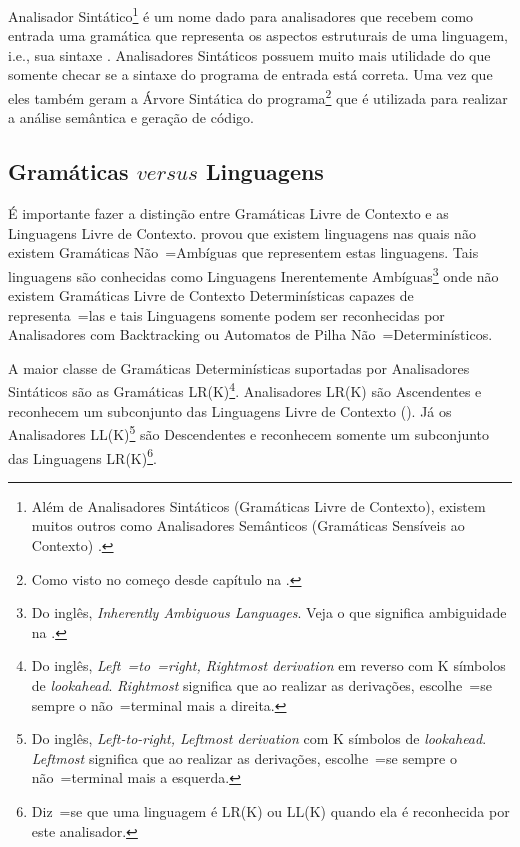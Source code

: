 Analisador Sintático\footnote{
Além de Analisadores Sintáticos (Gramáticas Livre de Contexto),
existem muitos outros como Analisadores Semânticos (Gramáticas Sensíveis ao Contexto) \cite{contextSensitiveParsing}.
}
é um nome dado para analisadores que recebem como entrada uma gramática que representa os aspectos estruturais de uma linguagem,
i.e.,
sua sintaxe \cite{ahoCompilerDragonBook}.
Analisadores Sintáticos possuem muito mais utilidade do que somente checar se a sintaxe do programa de entrada está correta.
Uma vez que eles também geram a Árvore Sintática do programa\footnote{
Como visto no começo desde capítulo na .
}
que é utilizada para realizar a análise semântica e
geração de código.


\subsection{Gramáticas $versus$ Linguagens}
\label{gramaticasVersusLinguagens}

É importante fazer a distinção entre Gramáticas Livre de Contexto e
as Linguagens Livre de Contexto.
 provou que existem linguagens nas quais não existem Gramáticas Não~=Ambíguas que representem estas linguagens.
Tais linguagens são conhecidas como Linguagens Inerentemente Ambíguas\footnote{
Do inglês,
\textit{Inherently Ambiguous Languages}.
Veja o que significa ambiguidade na .
}
onde não existem Gramáticas Livre de Contexto Determinísticas capazes de representa~=las e
tais Linguagens somente podem ser reconhecidas por Analisadores com Backtracking \cite{ahoCompilerDragonBook} ou
Automatos de Pilha Não~=Determinísticos.

A maior classe de Gramáticas Determinísticas suportadas por Analisadores Sintáticos são as Gramáticas LR(K)\footnote{
Do inglês, \textit{Left~=to~=right,
Rightmost derivation} em reverso com K símbolos de \textit{lookahead}.
\textit{Rightmost} significa que ao realizar as derivações,
escolhe~=se sempre o não~=terminal mais a direita.
}.
Analisadores LR(K) \cite{ahoCompilerDragonBook} são Ascendentes e
reconhecem um subconjunto das Linguagens Livre de Contexto ().
Já os Analisadores LL(K)\footnote{
Do inglês, \textit{Left-to-right,
Leftmost derivation} com K símbolos de \textit{lookahead}.
\textit{Leftmost} significa que ao realizar as derivações,
escolhe~=se sempre o não~=terminal mais a esquerda.
}
são Descendentes \cite{antlrBookTerrentParr,llStarAntlr,allStarAntlr} e
reconhecem somente um subconjunto das Linguagens LR(K)\footnote{
Diz~=se que uma linguagem é LR(K) ou
LL(K) quando ela é reconhecida por este analisador.
}.

